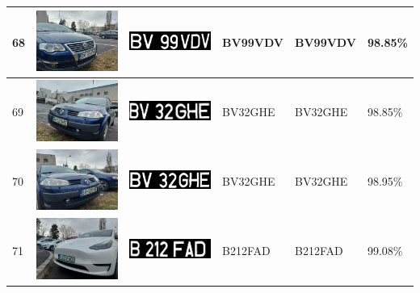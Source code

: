 \documentclass[a4paper,12pt]{report}
\begin{document}
\begin{longtable}{| m{0.6cm} | m{3cm} | m{3cm} | m{1.8cm} | m{1.8cm} | m{1.8cm} |}
    68  & \includegraphics[width=3cm,keepaspectratio]{dataset/38_s1.jpg}  & \includegraphics[width=3cm,keepaspectratio]{segmentari/68.jpg}  & BV99VDV             & BV99VDV              & 98.85\%    \\ \hline
    69  & \includegraphics[width=3cm,keepaspectratio]{dataset/39_d1.jpg}  & \includegraphics[width=3cm,keepaspectratio]{segmentari/69.jpg}  & BV32GHE             & BV32GHE              & 98.85\%    \\ \hline
    70  & \includegraphics[width=3cm,keepaspectratio]{dataset/39_s1.jpg}  & \includegraphics[width=3cm,keepaspectratio]{segmentari/70.jpg}  & BV32GHE             & BV32GHE              & 98.95\%    \\ \hline
    71  & \includegraphics[width=3cm,keepaspectratio]{dataset/40_d1.jpg}  & \includegraphics[width=3cm,keepaspectratio]{segmentari/71.jpg}  & B212FAD             & B212FAD              & 99.08\%    \\ \hline

\end{longtable}
\end{document}
